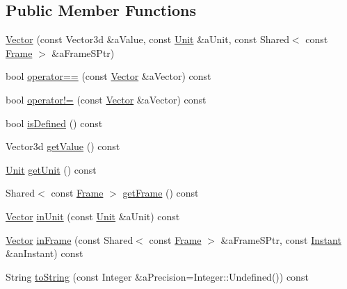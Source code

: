 \subsection*{Public Member Functions}
\begin{DoxyCompactItemize}
\item 
\hyperlink{classostk_1_1physics_1_1data_1_1_vector_a513244719d0a6b4a37537ed5c9bb2c27}{Vector} (const Vector3d \&a\+Value, const \hyperlink{classostk_1_1physics_1_1_unit}{Unit} \&a\+Unit, const Shared$<$ const \hyperlink{classostk_1_1physics_1_1coord_1_1_frame}{Frame} $>$ \&a\+Frame\+S\+Ptr)
\item 
bool \hyperlink{classostk_1_1physics_1_1data_1_1_vector_a4be0fe51a56b19eb4c7252436944b382}{operator==} (const \hyperlink{classostk_1_1physics_1_1data_1_1_vector}{Vector} \&a\+Vector) const
\item 
bool \hyperlink{classostk_1_1physics_1_1data_1_1_vector_a732642a94770c1486537368c44a0d434}{operator!=} (const \hyperlink{classostk_1_1physics_1_1data_1_1_vector}{Vector} \&a\+Vector) const
\item 
bool \hyperlink{classostk_1_1physics_1_1data_1_1_vector_aa5fee0fe657ba4b33e835ed4df37d0e1}{is\+Defined} () const
\item 
Vector3d \hyperlink{classostk_1_1physics_1_1data_1_1_vector_a33bd2c79920db43a8335918da8d5e79b}{get\+Value} () const
\item 
\hyperlink{classostk_1_1physics_1_1_unit}{Unit} \hyperlink{classostk_1_1physics_1_1data_1_1_vector_a467f0ab9ff5d9e83c6e3ce64ebfb8c95}{get\+Unit} () const
\item 
Shared$<$ const \hyperlink{classostk_1_1physics_1_1coord_1_1_frame}{Frame} $>$ \hyperlink{classostk_1_1physics_1_1data_1_1_vector_a39b99207e2617954be6629916d327fb6}{get\+Frame} () const
\item 
\hyperlink{classostk_1_1physics_1_1data_1_1_vector}{Vector} \hyperlink{classostk_1_1physics_1_1data_1_1_vector_a0ea065eeb3ccb829951c81c206eefd76}{in\+Unit} (const \hyperlink{classostk_1_1physics_1_1_unit}{Unit} \&a\+Unit) const
\item 
\hyperlink{classostk_1_1physics_1_1data_1_1_vector}{Vector} \hyperlink{classostk_1_1physics_1_1data_1_1_vector_af297f2ff4ae6d6e52aba683c6c78ab94}{in\+Frame} (const Shared$<$ const \hyperlink{classostk_1_1physics_1_1coord_1_1_frame}{Frame} $>$ \&a\+Frame\+S\+Ptr, const \hyperlink{classostk_1_1physics_1_1time_1_1_instant}{Instant} \&an\+Instant) const
\item 
String \hyperlink{classostk_1_1physics_1_1data_1_1_vector_aa1350ef1a2124c98a47900a0d81b5506}{to\+String} (const Integer \&a\+Precision=Integer\+::\+Undefined()) const
\end{DoxyCompactItemize}
